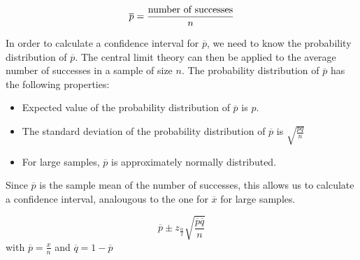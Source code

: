 \[ \overline{p} = \frac{\textnormal{number of successes}}{n} \]

In order to calculate a confidence interval for $\overline{p}$, we need to know the probability distribution of $\overline{p}$. The central limit theory can then be applied to the average number of successes in a sample of size $n$. The probability distribution of $\overline{p}$ has the following properties:

\begin{itemize}
  \item Expected value of the probability distribution of  $\overline{p}$ is $p$.
  \item The standard deviation of the probability distribution of $\overline{p}$ is $\sqrt{\frac{pq}{n}}$
  \item For large samples, $\overline{p}$ is approximately normally distributed.
\end{itemize}

Since $\overline{p}$ is the sample mean of the number of successes, this allows us to calculate a confidence interval, analougous to the one for $\overline{x}$ for large samples.

\begin{definition}
  \[ \overline{p} \pm z_{\frac{\alpha}{2}} \sqrt{\frac{\overline{p}\overline{q}}{n}} \]
  with $\overline{p} = \frac{x}{n}$ and $\overline{q} = 1- \overline{p}$
\end{definition}

